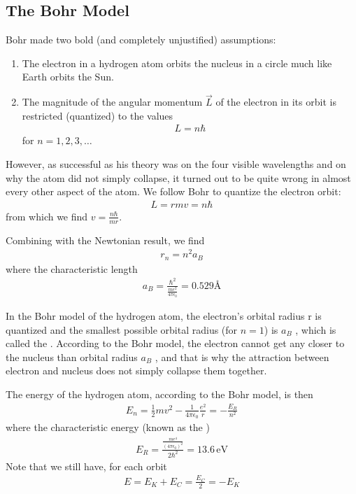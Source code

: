 \subsection{The Bohr Model}
Bohr made two bold (and completely unjustified) assumptions:
\begin{enumerate}
    \item The electron in a hydrogen atom orbits the nucleus in a circle much like Earth orbits the Sun. 
    \item The magnitude of the angular momentum $\vec{L}$ of the electron in its orbit is restricted (quantized) to the values
    \begin{align*}
        L=n\hbar
    \end{align*}
    for $n=1,2,3,\dots$
\end{enumerate}

However, as successful as his theory was on the four visible wavelengths and on why the atom did not simply collapse, it turned out to be quite wrong in almost every other aspect of the atom. We follow Bohr to quantize the electron orbit:
\begin{align*}
    L=rmv=n\hbar
\end{align*}
from which we find $v=\frac{n\hbar}{mr}$. 

Combining with the Newtonian result, we find 
\begin{align*}
    r_n=n^2a_B
\end{align*}
where the characteristic length
\begin{align*}
    a_B=\frac{\hbar^2}{\frac{me^2}{4\pi \epsilon_0}}=0.529\text{\AA}
\end{align*}

In the Bohr model of the hydrogen atom, the electron’s orbital radius r is quantized and the smallest possible orbital radius (for $n = 1$) is $a_B$ , which is called the . According to the Bohr model, the electron cannot get any closer to the nucleus than orbital radius $a_B$ , and that is why the attraction between electron and nucleus does not simply collapse them together.

The energy of the hydrogen atom, according to the Bohr
model, is then
\begin{align*}
    E_n=\frac{1}{2}mv^2-\frac{1}{4\pi \epsilon_0}\frac{e^2}{r}=-\frac{E_R}{n^2}
\end{align*}
where the characteristic energy (known as the )
\begin{align*}
    E_R=\frac{\frac{me^4}{(4\pi \epsilon_0)^2}}{2\hbar^2}=13.6 \, \text{eV}
\end{align*}
Note that we still have, for each orbit
\begin{align*}
    E=E_K+E_C=\frac{E_C}{2}=-E_K
\end{align*}

